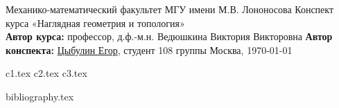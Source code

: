 \documentclass[a4paper, 12pt]{article}
\theoremstyle{plain}
\theoremstyle{definition}
\theoremstyle{remark}
\begin{document}
\begin{titlepage}
    \begin{center}
        \large Механико-математический факультет МГУ имени М.В. Лононосова
        \vfill
        \Large Конспект курса «Наглядная геометрия и топология» \bigskip \\
        \large \textbf{Автор курса:} профессор, д.ф.-м.н. Ведюшкина Виктория Викторовна
        \textbf{Автор конспекта:} \href{https://github.com/betel-git}{Цыбулин Егор}, студент 108 группы
        \vfill
        Москва, \today
    \end{center}
\end{titlepage}
\tableofcontents
\newpage


{c1.tex}
{c2.tex}
{c3.tex}

\newpage
{bibliography.tex}
\end{document}
